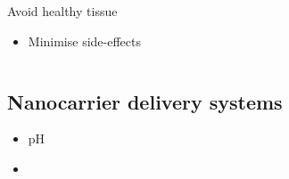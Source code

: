 \documentclass[aspectratio=169,compress]{beamer}
\begin{document}
\begin{frame}{\subsecname}
\begin{columns}
      \begin{block}{Avoid healthy tissue}
        \begin{itemize}
          \item<1-> Minimise side-effects
        \end{itemize}
      \end{block}

  \end{columns}
\end{frame}

\subsection{Nanocarrier delivery systems}
\begin{frame}{\subsecname}
  \begin{itemize}
    \item<1-> pH
    \item<1->
  \end{itemize}
\end{frame}
\end{document}
